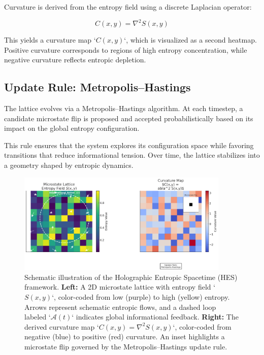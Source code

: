 \documentclass[12pt]{article}
\begin{document}
Curvature is derived from the entropy field using a discrete Laplacian operator:

\begin{equation}
C(x, y) = \nabla^2 S(x, y)
\end{equation}

This yields a curvature map `\( C(x, y) \)`, which is visualized as a second heatmap. Positive curvature corresponds to regions of high entropy concentration, while negative curvature reflects entropic depletion.

\subsection{Update Rule: Metropolis–Hastings}

The lattice evolves via a Metropolis–Hastings algorithm. At each timestep, a candidate microstate flip is proposed and accepted probabilistically based on its impact on the global entropy configuration.

This rule ensures that the system explores its configuration space while favoring transitions that reduce informational tension. Over time, the lattice stabilizes into a geometry shaped by entropic dynamics.

\begin{figure}[ht]
    \centering
    \includegraphics[width=0.9\textwidth]{Figures/Figure_5.png}
    \caption{
        Schematic illustration of the Holographic Entropic Spacetime (HES) framework.  
        \textbf{Left:} A 2D microstate lattice with entropy field `\( S(x, y) \)`, color-coded from low (purple) to high (yellow) entropy. Arrows represent schematic entropic flows, and a dashed loop labeled `\( \mathcal{A}(t) \)` indicates global informational feedback.  
        \textbf{Right:} The derived curvature map `\( C(x, y) = \nabla^2 S(x, y) \)`, color-coded from negative (blue) to positive (red) curvature. An inset highlights a microstate flip governed by the Metropolis–Hastings update rule.
    }
    \label{fig:HES_schematic}
\end{figure}
\end{document}

